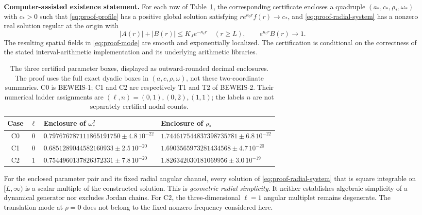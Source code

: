 \noindent\textbf{Computer-assisted existence statement.}
For each row of Table~\ref{tab:proof-cases}, the corresponding certificate
encloses a quadruple $(a_*,c_*,\rho_*,\omega_*)$ with $c_*>0$ such that
\eqref{eq:proof-profile} has a positive global solution satisfying
$r e^{\kappa_0r}f(r)\to c_*$, and
\eqref{eq:proof-radial-system} has a nonzero real solution regular at the
origin with
\begin{equation}
 |A(r)|+|B(r)|\leq K_J e^{-\kappa_c r}\quad(r\geq L),
 \qquad e^{\kappa_c r}B(r)\longrightarrow1.
 \label{eq:proof-decay}
\end{equation}
The resulting spatial fields in \eqref{eq:proof-mode} are smooth and
exponentially localized. The certification is
conditional on the correctness of the stated interval-arithmetic
implementation and its underlying arithmetic libraries.

\begin{table}[htbp]
\centering
\small
\begin{tabular}{ccll}
\hline
Case & $\ell$ & Enclosure of $\omega_*^2$ & Enclosure of $\rho_*$ \\
\hline
C0 & 0 & $0.797676787111865191750\pm4.8\,10^{-22}$
       & $1.744617544837398735781\pm6.8\,10^{-22}$ \\
C1 & 0 & $0.6851289044582160933\pm2.5\,10^{-20}$
       & $1.6903565973281434568\pm4.7\,10^{-20}$ \\
C2 & 1 & $0.7544960137826372331\pm7.8\,10^{-20}$
       & $1.826342030181069956\pm3.0\,10^{-19}$ \\
\hline
\end{tabular}
\caption{The three certified parameter boxes, displayed as outward-rounded
decimal enclosures. The proof uses the full exact dyadic boxes in
$(a,c,\rho,\omega)$, not these two-coordinate summaries. C0 is BEWEIS-1;
C1 and C2 are respectively T1 and T2 of BEWEIS-2. Their numerical ladder
assignments are $(\ell,n)=(0,1),(0,2),(1,1)$; the labels $n$ are not
separately certified nodal counts.}
\label{tab:proof-cases}
\end{table}

For the enclosed parameter pair and its fixed radial angular channel, every
solution of \eqref{eq:proof-radial-system} that is square integrable on
$[L,\infty)$ is a scalar multiple of the constructed solution. This is
\emph{geometric radial simplicity}. It neither establishes algebraic
simplicity of a dynamical generator nor excludes Jordan chains. For C2,
the three-dimensional $\ell=1$ angular multiplet remains degenerate.
The translation mode at $\rho=0$ does not belong to the fixed nonzero
frequency considered here.

